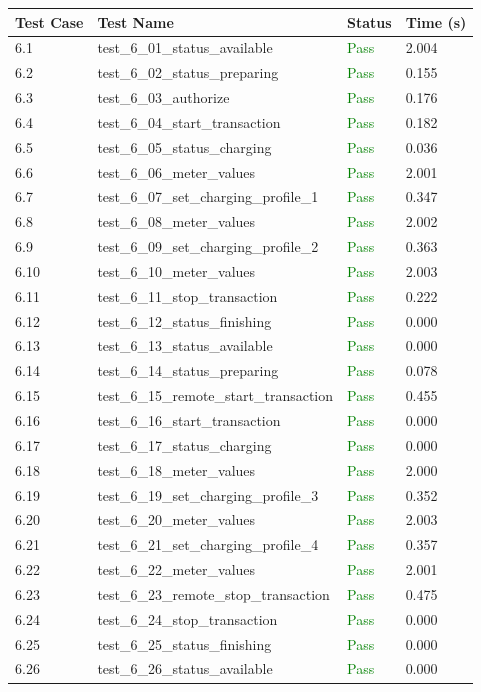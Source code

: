 \documentclass{article}
\begin{document}
\begin{longtable}{p{} p{} p{} p{}}
\toprule
\textbf{Test Case} & \textbf{Test Name} & \textbf{Status} & \textbf{Time (s)} \\
\midrule
\endhead
6.1 & test\_6\_01\_status\_available & \textcolor{green}{Pass} & 2.004 \\
6.2 & test\_6\_02\_status\_preparing & \textcolor{green}{Pass} & 0.155 \\
6.3 & test\_6\_03\_authorize & \textcolor{green}{Pass} & 0.176 \\
6.4 & test\_6\_04\_start\_transaction & \textcolor{green}{Pass} & 0.182 \\
6.5 & test\_6\_05\_status\_charging & \textcolor{green}{Pass} & 0.036 \\
6.6 & test\_6\_06\_meter\_values & \textcolor{green}{Pass} & 2.001 \\
6.7 & test\_6\_07\_set\_charging\_profile\_1 & \textcolor{green}{Pass} & 0.347 \\
6.8 & test\_6\_08\_meter\_values & \textcolor{green}{Pass} & 2.002 \\
6.9 & test\_6\_09\_set\_charging\_profile\_2 & \textcolor{green}{Pass} & 0.363 \\
6.10 & test\_6\_10\_meter\_values & \textcolor{green}{Pass} & 2.003 \\
6.11 & test\_6\_11\_stop\_transaction & \textcolor{green}{Pass} & 0.222 \\
6.12 & test\_6\_12\_status\_finishing & \textcolor{green}{Pass} & 0.000 \\
6.13 & test\_6\_13\_status\_available & \textcolor{green}{Pass} & 0.000 \\
6.14 & test\_6\_14\_status\_preparing & \textcolor{green}{Pass} & 0.078 \\
6.15 & test\_6\_15\_remote\_start\_transaction & \textcolor{green}{Pass} & 0.455 \\
6.16 & test\_6\_16\_start\_transaction & \textcolor{green}{Pass} & 0.000 \\
6.17 & test\_6\_17\_status\_charging & \textcolor{green}{Pass} & 0.000 \\
6.18 & test\_6\_18\_meter\_values & \textcolor{green}{Pass} & 2.000 \\
6.19 & test\_6\_19\_set\_charging\_profile\_3 & \textcolor{green}{Pass} & 0.352 \\
6.20 & test\_6\_20\_meter\_values & \textcolor{green}{Pass} & 2.003 \\
6.21 & test\_6\_21\_set\_charging\_profile\_4 & \textcolor{green}{Pass} & 0.357 \\
6.22 & test\_6\_22\_meter\_values & \textcolor{green}{Pass} & 2.001 \\
6.23 & test\_6\_23\_remote\_stop\_transaction & \textcolor{green}{Pass} & 0.475 \\
6.24 & test\_6\_24\_stop\_transaction & \textcolor{green}{Pass} & 0.000 \\
6.25 & test\_6\_25\_status\_finishing & \textcolor{green}{Pass} & 0.000 \\
6.26 & test\_6\_26\_status\_available & \textcolor{green}{Pass} & 0.000 \\
\bottomrule
\end{longtable}
\end{document}
